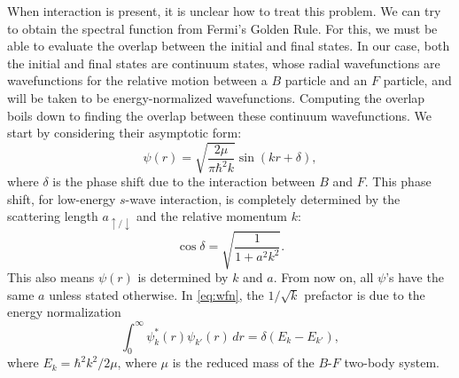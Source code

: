\documentclass{article}
\theoremstyle{definition}
\newcommand{\f}[2]{\frac{#1}{#2}}
\begin{document}
When interaction is present, it is unclear how to treat this problem. We can try to obtain the spectral function from Fermi's Golden Rule. For this, we must be able to evaluate the overlap between the initial and final states. In our case, both the initial and final states are continuum states, whose radial wavefunctions are wavefunctions for the relative motion between a $B$ particle and an $F$ particle, and will be taken to be energy-normalized wavefunctions. Computing the overlap boils down to finding the overlap between these continuum wavefunctions. We start by considering their asymptotic form:
\begin{equation}\label{eq:wfn}
\psi(r) = \sqrt{\frac{2\mu}{\pi \hbar^2 k}} \sin(kr + \delta),
\end{equation}
where $\delta$ is the phase shift due to the interaction between $B$ and $F$. This phase shift, for low-energy $s$-wave interaction, is completely determined by the scattering length $a_{\uparrow/\downarrow}$ and the relative momentum $k$:
\begin{equation} \label{eq:phase_shift}
\cos \delta = \sqrt{\f{1}{1 + a^2 k^2}}.
\end{equation}
This also means $\psi(r)$ is determined by $k$ and $a$. From now on, all $\psi$'s have the same $a$ unless stated otherwise. In \eqref{eq:wfn}, the $1/\sqrt{k}$ prefactor is due to the energy normalization
\begin{equation}\label{eq:norm}
\int_0^\infty \psi_k^*(r) \psi_{k'}(r) \,dr = \delta(E_k - E_{k'}),
\end{equation}
where $E_k = \hbar^2 k^2 / 2\mu$, where $\mu$ is the reduced mass of the $B$-$F$ two-body system. \\
\end{document}
